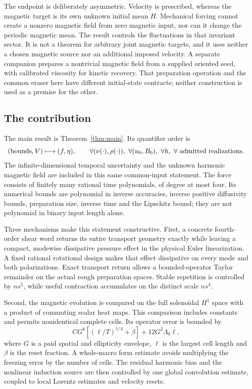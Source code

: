 \documentclass[11pt,a4paper]{amsart}
\theoremstyle{definition}
\theoremstyle{remark}
\numberwithin{equation}{section}
\begin{document}
The endpoint is deliberately asymmetric. Velocity is prescribed, whereas the magnetic target is its own unknown initial mean $H$. Mechanical forcing cannot create a nonzero magnetic field from zero magnetic input, nor can it change the periodic magnetic mean. The result controls the fluctuations in that invariant sector. It is not a theorem for arbitrary joint magnetic targets, and it uses neither a chosen magnetic source nor an additional imposed velocity. A separate companion \cite{SeedPreparation} prepares a nontrivial magnetic field from a supplied oriented seed, with calibrated viscosity for kinetic recovery. That preparation operation and the common eraser here have different initial-state contracts; neither construction is used as a premise for the other.

\subsection{The contribution}
The main result is Theorem~\ref{thm:main}. Its quantifier order is
\[
 (\hbox{bounds},V)\longmapsto(f,\eta),\qquad
 \forall(\nu(\cdot),\rho(\cdot)),\ \forall(u_0,B_0),\ \forall h,
 \ \forall\hbox{ admitted realizations}.
\]
The infinite-dimensional temporal uncertainty and the unknown harmonic magnetic field are included in this same common-input statement. The force consists of finitely many rational time polynomials, of degree at most four. Its numerical bounds are polynomial in inverse accuracies, inverse positive diffusivity bounds, preparation size, inverse time and the Lipschitz bound; they are not polynomial in binary input length alone.

Three mechanisms make this statement constructive. First, a concrete fourth-order shear word returns its entire transport geometry exactly while leaving a compact, modewise dissipative pressure effect in the physical Euler linearization. A fixed rational rotational design makes that effect dissipative on every mode and both polarizations. Exact transport return allows a bounded-operator Taylor remainder on the actual rough preparation spaces. Stable repetition is controlled by $ns^5$, while useful contraction accumulates on the distinct scale $ns^4$.

Second, the magnetic evolution is compared on the full solenoidal $H^1$ space with a product of commuting scalar heat maps. This comparison includes constants and permits nonidentical complete cells. Its operator error is bounded by
\[
 CG^8[(\ell/T)^{1/4}+\beta]+12G^2\Lambda_0\ell,
\]
where $G$ is a paid spatial and ellipticity envelope, $\ell$ is the largest cell length and $\beta$ is the reset fraction. A whole-macro form estimate avoids multiplying the freezing error by the number of cells. The residual harmonic bias and the nonlinear induction source are then controlled by one global convolution estimate, coupled to local Lorentz estimates and velocity resets.
\end{document}
